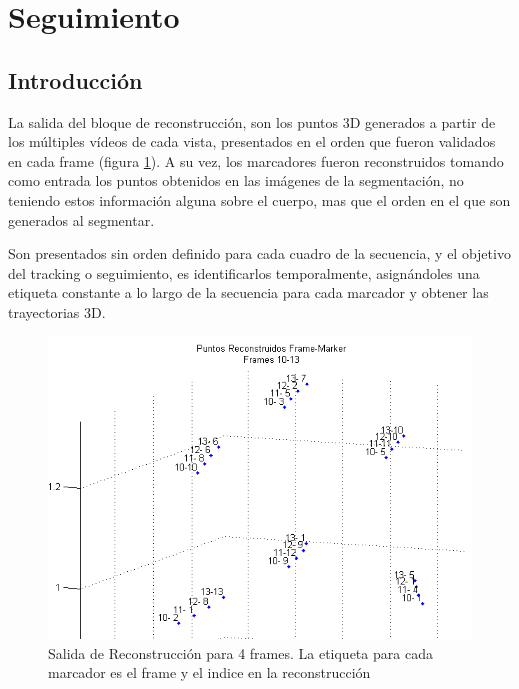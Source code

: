 \section{Seguimiento}

\subsection{Introducción}

La salida del bloque de reconstrucción, son los puntos 3D generados a partir de los múltiples vídeos de cada vista, presentados en el orden que fueron validados en cada frame (figura \ref{reconstr_00}). A su vez, los marcadores fueron reconstruidos tomando como entrada los puntos obtenidos en las imágenes de la segmentación, no teniendo estos información alguna sobre el cuerpo, mas que el orden en el que son generados al segmentar.

Son presentados sin orden definido para cada cuadro de la secuencia, y el objetivo del tracking o seguimiento, es identificarlos temporalmente, asignándoles una etiqueta constante a lo largo de la secuencia para cada marcador y obtener las trayectorias 3D.

\begin{figure}[hbt]
\begin{center}
\includegraphics[scale=0.8]{img/Tracking/00_Salida_Reconstruccion.png}
\end{center}
\caption{Salida de Reconstrucción para 4 frames. La etiqueta para cada marcador es el frame y el indice en la reconstrucción}
\label{reconstr_00}
\end{figure}

